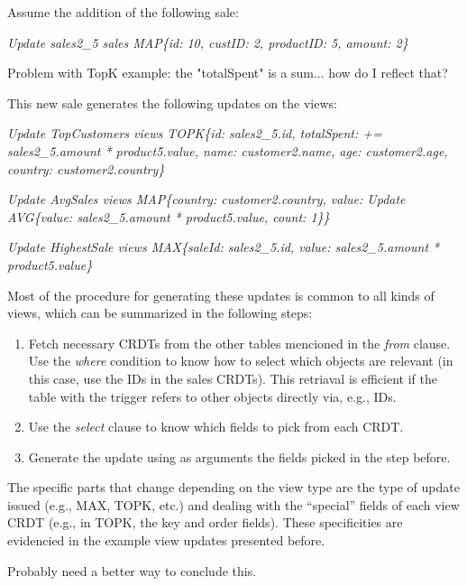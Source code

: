\documentclass{vldb}
\newcommand{\grumbler}[2]{{\color{red}{\bf #1:} #2}}
\newcommand{\andre}[1]{\grumbler{andre}{#1}}
\newcommand{\emphvspace}{0.5\baselineskip}
\newcommand{\lineemph}[1]{\vspace{\emphvspace}\hspace{2em}\emph{#1}\vspace{\emphvspace}}
\newcommand{\firstblockemph}[1]{\vspace{\emphvspace}\hspace{2em}\emph{#1}}
\newcommand{\middleblockemph}[1]{\hspace{2em}\emph{#1}}
\newcommand{\lastblockemph}[1]{\hspace{2em}\emph{#1}\vspace{\emphvspace}}
\begin{document}
Assume the addition of the following sale:

\lineemph{Update sales2\_5 sales MAP\{id: 10, custID: 2, productID: 5, amount: 2\}}

\andre{Problem with TopK example: the "totalSpent" is a sum... how do I reflect that?}

This new sale generates the following updates on the views:

\firstblockemph{Update TopCustomers views TOPK\{id: sales2\_5.id, totalSpent: += sales2\_5.amount * product5.value, name: customer2.name, age: customer2.age, country: customer2.country\}}

\middleblockemph{Update AvgSales views MAP\{country: customer2.country, value: Update AVG\{value: sales2\_5.amount * product5.value, count: 1\}\}}

\lastblockemph{Update HighestSale views MAX\{saleId: sales2\_5.id, value: sales2\_5.amount * product5.value\}}

Most of the procedure for generating these updates is common to all kinds of views, which can be summarized in the following steps:

\begin{enumerate}
	\item Fetch necessary CRDTs from the other tables mencioned in the \emph{from} clause. 
	Use the \emph{where} condition to know how to select which objects are relevant (in this case, use the IDs in the sales CRDTs).
	This retriaval is efficient if the table with the trigger refers to other objects directly via, e.g., IDs.
	\item Use the \emph{select} clause to know which fields to pick from each CRDT.
	\item Generate the update using as arguments the fields picked in the step before.
\end{enumerate}

The specific parts that change depending on the view type are the type of update issued (e.g., MAX, TOPK, etc.) and dealing with the ``special'' fields of each view CRDT (e.g., in TOPK, the key and order fields).
These specificities are evidencied in the example view updates presented before.

\andre{Probably need a better way to conclude this.}
\end{document}
